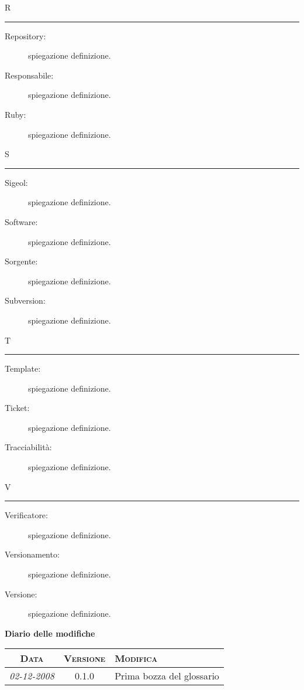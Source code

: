 \documentclass[11pt,a4paper]{article}
\newcommand{\modifiche} 
{
\newpage
\begin{center}
\textbf{Diario delle modifiche} \\
\bigskip
\begin{tabular}{|c|c|p{0.55\textwidth}|}
\hline
\textsc{Data} & \textsc{Versione} & \textsc{Modifica} \\
\hline
\hline
\textit{02-12-2008} & 0.1.0 & Prima bozza del glossario \\
\hline
\end{tabular}
\end{center}
}
\begin{document}
\bigskip
\Huge R \bigskip
\hrule
\smallskip
\normalsize
\begin{description}
	\item[Repository:] spiegazione definizione.
	\item[Responsabile:] spiegazione definizione.
	\item[Ruby:] spiegazione definizione.
\end{description}
\bigskip
\Huge S \bigskip
\hrule
\smallskip
\normalsize
\begin{description}
	\item[Sigeol:] spiegazione definizione.
	\item[Software:] spiegazione definizione.
	\item[Sorgente:] spiegazione definizione.
	\item[Subversion:] spiegazione definizione.
\end{description}
\bigskip
\Huge T \bigskip
\hrule
\smallskip
\normalsize
\begin{description}
	\item[Template:] spiegazione definizione.
	\item[Ticket:] spiegazione definizione.
	\item[Tracciabilità:] spiegazione definizione.
\end{description}
\bigskip
\Huge V \bigskip
\hrule
\smallskip
\normalsize
\begin{description}
	\item[Verificatore:] spiegazione definizione.
	\item[Versionamento:] spiegazione definizione.
	\item[Versione:] spiegazione definizione.
\end{description}
\bigskip
\modifiche
\end{document}
